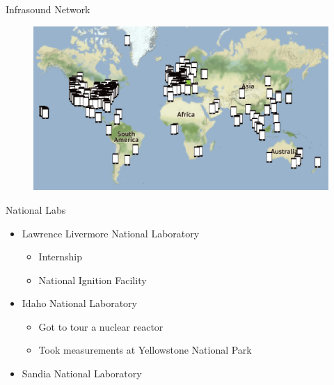 \documentclass{beamer}
\begin{document}
\begin{frame}{Infrasound Network}
\begin{figure}
	\includegraphics[width=\linewidth]{img/network.png}
\end{figure}
\end{frame}

\begin{frame}{National Labs}
\begin{itemize}
	\item Lawrence Livermore National Laboratory
	\begin{itemize}
		\item Internship
		\item National Ignition Facility
	\end{itemize}
	\item Idaho National Laboratory
	\begin{itemize}
		\item Got to tour a nuclear reactor
		\item Took measurements at Yellowstone National Park
	\end{itemize}
	\item Sandia National Laboratory
\end{itemize}
\end{frame}
\end{document}
